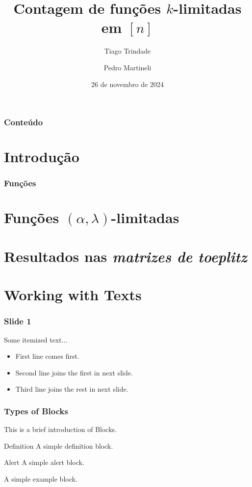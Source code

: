 \documentclass[aspectratio=169]{beamer}
\title[$k$-limitadas] {Contagem de funções $k$-limitadas em $[n]$}
\author[] {Tiago Trindade \and Pedro Martineli}
\institute[IAL] {Instituto Alpha Lumen}
\date[Novembro, 2024]{26 de novembro de 2024}
\begin{document}
\frame{\titlepage}  %

\begin{frame}
\frametitle{Conteúdo}
\tableofcontents
\end{frame}

\section{Introdução}

\begin{frame}
\frametitle{Funções}
\end{frame}

\section{Funções $(\alpha, \lambda)$-limitadas}
\section{Resultados nas \textit{matrizes de toeplitz}}

\section{Working with Texts}

\begin{frame}
\frametitle{Slide 1}
Some itemized text...

\begin{itemize}
    \item<1-> First line comes first. 
    \item<2-> Second line joins the first in next slide.
    \item<3-> Third line joins the rest in next slide.
\end{itemize}

\end{frame}


\begin{frame}
  \frametitle{Types of Blocks}
  
  This is a brief introduction of \alert{Blocks}.
  
  \begin{block}{Definition}
  A simple definition block.
  \end{block}
  
  \begin{alertblock}{Alert}
  A simple alert block.
  \end{alertblock}
  
  \begin{examples}
  A simple example block.
  \end{examples}
\end{frame}
\end{document}
